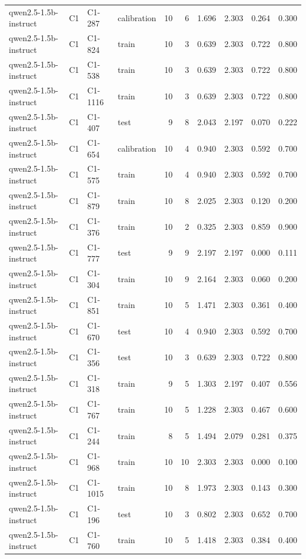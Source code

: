 \begin{table}
\begin{tabular}{llllrrrrrr}
qwen2.5-1.5b-instruct & C1 & C1-287 & calibration & 10 & 6 & 1.696 & 2.303 & 0.264 & 0.300 \\
qwen2.5-1.5b-instruct & C1 & C1-824 & train & 10 & 3 & 0.639 & 2.303 & 0.722 & 0.800 \\
qwen2.5-1.5b-instruct & C1 & C1-538 & train & 10 & 3 & 0.639 & 2.303 & 0.722 & 0.800 \\
qwen2.5-1.5b-instruct & C1 & C1-1116 & train & 10 & 3 & 0.639 & 2.303 & 0.722 & 0.800 \\
qwen2.5-1.5b-instruct & C1 & C1-407 & test & 9 & 8 & 2.043 & 2.197 & 0.070 & 0.222 \\
qwen2.5-1.5b-instruct & C1 & C1-654 & calibration & 10 & 4 & 0.940 & 2.303 & 0.592 & 0.700 \\
qwen2.5-1.5b-instruct & C1 & C1-575 & train & 10 & 4 & 0.940 & 2.303 & 0.592 & 0.700 \\
qwen2.5-1.5b-instruct & C1 & C1-879 & train & 10 & 8 & 2.025 & 2.303 & 0.120 & 0.200 \\
qwen2.5-1.5b-instruct & C1 & C1-376 & train & 10 & 2 & 0.325 & 2.303 & 0.859 & 0.900 \\
qwen2.5-1.5b-instruct & C1 & C1-777 & test & 9 & 9 & 2.197 & 2.197 & 0.000 & 0.111 \\
qwen2.5-1.5b-instruct & C1 & C1-304 & train & 10 & 9 & 2.164 & 2.303 & 0.060 & 0.200 \\
qwen2.5-1.5b-instruct & C1 & C1-851 & train & 10 & 5 & 1.471 & 2.303 & 0.361 & 0.400 \\
qwen2.5-1.5b-instruct & C1 & C1-670 & test & 10 & 4 & 0.940 & 2.303 & 0.592 & 0.700 \\
qwen2.5-1.5b-instruct & C1 & C1-356 & test & 10 & 3 & 0.639 & 2.303 & 0.722 & 0.800 \\
qwen2.5-1.5b-instruct & C1 & C1-318 & train & 9 & 5 & 1.303 & 2.197 & 0.407 & 0.556 \\
qwen2.5-1.5b-instruct & C1 & C1-767 & train & 10 & 5 & 1.228 & 2.303 & 0.467 & 0.600 \\
qwen2.5-1.5b-instruct & C1 & C1-244 & train & 8 & 5 & 1.494 & 2.079 & 0.281 & 0.375 \\
qwen2.5-1.5b-instruct & C1 & C1-968 & train & 10 & 10 & 2.303 & 2.303 & 0.000 & 0.100 \\
qwen2.5-1.5b-instruct & C1 & C1-1015 & train & 10 & 8 & 1.973 & 2.303 & 0.143 & 0.300 \\
qwen2.5-1.5b-instruct & C1 & C1-196 & test & 10 & 3 & 0.802 & 2.303 & 0.652 & 0.700 \\
qwen2.5-1.5b-instruct & C1 & C1-760 & train & 10 & 5 & 1.418 & 2.303 & 0.384 & 0.400 \\

\end{tabular}
\end{table}
